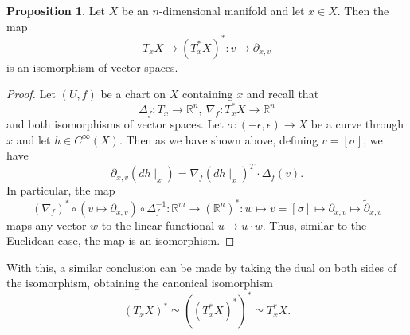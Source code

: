 \documentclass[]{article}
\theoremstyle{definition}
\theoremstyle{definition}
\newtheorem{proposition}{Proposition}[section]
\begin{document}
\begin{proposition}
  Let \(X\) be an \(n\)-dimensional manifold and let \(x \in X\). Then the 
  map 
  \[T_x X \to (T^*_x X)^* : v \mapsto \partial_{x, v}\]
  is an isomorphism of vector spaces.
\end{proposition}
\begin{proof}
  Let \((U, f)\) be a chart on \(X\) containing \(x\) and recall that 
  \[\Delta_f : T_x \to \mathbb{R}^n, \ \nabla_f : T^*_x X \to \mathbb{R}^n\]
  and both isomorphisms of vector spaces. Let \(\sigma : (-\epsilon, \epsilon) 
  \to X\) be a curve through \(x\) and let \(h \in C^\infty(X)\). Then 
  as we have shown above, defining \(v = [\sigma]\), we have
  \[\partial_{x, v}(dh\mid_x) = \nabla_f(dh\mid_x)^T \cdot \Delta_f(v).\]
  In particular, the map 
  \[ (\nabla_f)^* \circ (v \mapsto \partial_{x, v}) \circ \Delta_f^{-1}:
    \mathbb{R}^m \to (\mathbb{R}^n)^* : w \mapsto v = [\sigma] \mapsto 
    \partial_{x, v} \mapsto \tilde \partial_{x, v}\]
  maps any vector \(w\) to the linear functional \(u \mapsto u \cdot w\). 
  Thus, similar to the Euclidean case, the map is an isomorphism.
\end{proof}

With this, a similar conclusion can be made by taking the dual on both 
sides of the isomorphism, obtaining the canonical isomorphism
\[(T_x X)^* \simeq ((T^*_x X)^*)^* \simeq T^*_x X.\]
\end{document}
